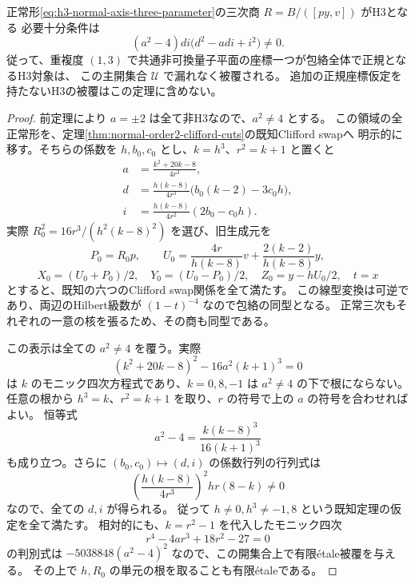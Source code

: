 \begin{theorem}[正規共通量子座標領域の全H3判定]
\label{thm:h3-order2-normal-axis-complete-admissibility}
正常形\eqref{eq:h3-normal-axis-three-parameter}の三次商 $R=B/([py,v])$ がH3となる
必要十分条件は
\begin{equation}\label{eq:h3-normal-axis-admissible-open}
 (a^2-4)di\bigl(d^2-adi+i^2\bigr)\ne0.
\end{equation}
従って、重複度 $(1,3)$ で共通非可換量子平面の座標一つが包絡全体で正規となるH3対象は、
この主開集合 $\mathcal U$ で漏れなく被覆される。
追加の正規座標仮定を持たないH3の被覆はこの定理に含めない。
\end{theorem}
\begin{proof}
前定理により $a=\pm2$ は全て非H3なので、$a^2\ne4$ とする。
この領域の全正常形を、定理\ref{thm:normal-order2-clifford-cuts}の既知Clifford swapへ
明示的に移す。そちらの係数を $h,b_0,c_0$ とし、$k=h^3$、$r^2=k+1$ と置くと
\begin{align*}
 a&=\frac{k^2+20k-8}{4r^3},\\
 d&=\frac{h(k-8)}{4r^3}\bigl(b_0(k-2)-3c_0h\bigr),\\
 i&=\frac{h(k-8)}{4r^2}(2b_0-c_0h).
\end{align*}
実際 $R_0^2=16r^3/(h^2(k-8)^2)$ を選び、旧生成元を
\[
 P_0=R_0p,\qquad U_0=\frac{4r}{h(k-8)}v+\frac{2(k-2)}{h(k-8)}y,
\]
\[
 X_0=(U_0+P_0)/2,\quad Y_0=(U_0-P_0)/2,\quad
 Z_0=y-hU_0/2,\quad t=x
\]
とすると、既知の六つのClifford swap関係を全て満たす。
この線型変換は可逆であり、両辺のHilbert級数が $(1-t)^{-4}$ なので包絡の同型となる。
正常三次もそれぞれの一意の核を張るため、その商も同型である。

この表示は全ての $a^2\ne4$ を覆う。実際
\[
 (k^2+20k-8)^2-16a^2(k+1)^3=0
\]
は $k$ のモニック四次方程式であり、$k=0,8,-1$ は $a^2\ne4$ の下で根にならない。
任意の根から $h^3=k$、$r^2=k+1$ を取り、$r$ の符号で上の $a$ の符号を合わせればよい。
恒等式
\[
 a^2-4=\frac{k(k-8)^3}{16(k+1)^3}
\]
も成り立つ。さらに $(b_0,c_0)\mapsto(d,i)$ の係数行列の行列式は
\[
 \left(\frac{h(k-8)}{4r^3}\right)^2hr(8-k)\ne0
\]
なので、全ての $d,i$ が得られる。
従って $h\ne0,h^3\ne-1,8$ という既知定理の仮定を全て満たす。
相対的にも、$k=r^2-1$ を代入したモニック四次
\[
 r^4-4ar^3+18r^2-27=0
\]
の判別式は $-5038848(a^2-4)^2$ なので、この開集合上で有限\'{e}tale被覆を与える。
その上で $h,R_0$ の単元の根を取ることも有限\'{e}taleである。


\end{proof}

